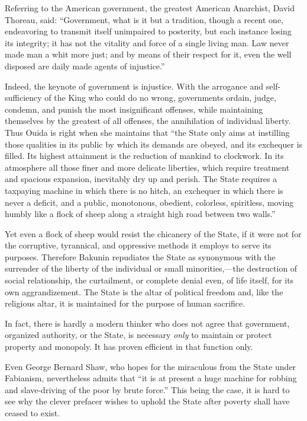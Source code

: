 Referring to the American government, the greatest American Anarchist,
David Thoreau, said: ``Government, what is it but a tradition, though
a recent one, endeavoring to transmit itself unimpaired to posterity,
but each instance losing its integrity; it has not the vitality and
force of a single living man. Law never made man a whit more just; and
by  means of their respect for it, even the well disposed are
daily made agents of injustice.''

Indeed, the keynote of government is injustice. With the arrogance and
self-sufficiency of the King who could do no wrong, governments
ordain, judge, condemn, and punish the most insignificant offenses,
while maintaining themselves by the greatest of all offenses, the
annihilation of individual liberty. Thus Ouida is right when she
maintains that ``the State only aims at instilling those qualities in
its public by which its demands are obeyed, and its exchequer is
filled. Its highest attainment is the reduction of mankind to
clockwork. In its atmosphere all those finer and more delicate
liberties, which require treatment and spacious expansion, inevitably
dry up and perish. The State requires a taxpaying machine in which
there is no hitch, an exchequer in which there is never a deficit, and
a public, monotonous, obedient, colorless, spiritless, moving humbly
like a flock of sheep along a straight high road between two walls.''

Yet even a flock of sheep would resist the chicanery of the State, if
it were not for the corruptive, tyrannical, and oppressive methods it
employs to serve its purposes. Therefore Bakunin repudiates the State
as synonymous with the surrender of the liberty of the individual or
small minorities,---the destruction of social relationship, the
curtailment, or complete denial even, of life itself, for its own
aggrandizement. The State is the altar of political freedom and, like
the religious altar, it is maintained for the purpose of human
sacrifice.

In fact, there is hardly a modern thinker who  does not agree
that government, organized authority, or the State, is necessary
\textit{only} to maintain or protect property and monopoly. It has
proven efficient in that function only.

Even George Bernard Shaw, who hopes for the miraculous from the State
under Fabianism, nevertheless admits that ``it is at present a huge
machine for robbing and slave-driving of the poor by brute force.''
This being the case, it is hard to see why the clever prefacer wishes
to uphold the State after poverty shall have ceased to exist.

